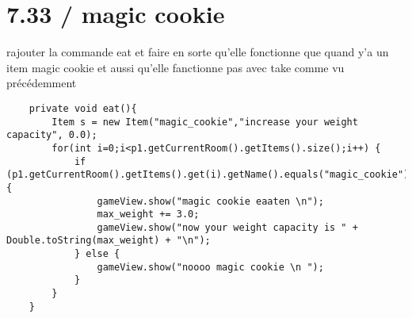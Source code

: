 \documentclass[a4paper , 10pt]{article}
\begin{document}
\section{7.33 / magic cookie}
rajouter la commande eat et faire en sorte qu'elle fonctionne que quand y'a un item magic cookie et aussi qu'elle fanctionne pas avec take comme vu précédemment 
\begin{verbatim}
    private void eat(){
        Item s = new Item("magic_cookie","increase your weight capacity", 0.0);
        for(int i=0;i<p1.getCurrentRoom().getItems().size();i++) {
            if (p1.getCurrentRoom().getItems().get(i).getName().equals("magic_cookie")) {
                gameView.show("magic cookie eaaten \n");
                max_weight += 3.0;
                gameView.show("now your weight capacity is " + Double.toString(max_weight) + "\n");
            } else {
                gameView.show("noooo magic cookie \n ");
            }
        }
    }
\end{verbatim}
\end{document}
